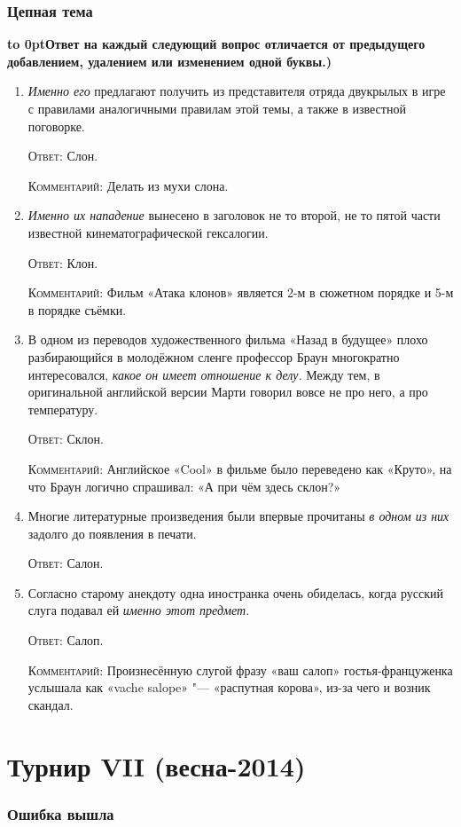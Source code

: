 \documentclass[a4paper,10pt]{article}
\let\keyword\textsc
\newenvironment{topic}{\begin{enumerate}}{\end{enumerate}}
\newcommand{\question}[3]{\item[#1.] #2 \par \keyword{Ответ:} #3}
\newcommand{\commentary}[1]{\par \keyword{Комментарий:} #1}
\newcommand{\topiccommentary}[1]{\begin{adjustwidth}{0.9cm}{} \vspace{-0.3em}\textbf{\hbox to 0pt{\hss{(}}#1)} \end{adjustwidth}}
\begin{document}
\section{Цепная тема}
\topiccommentary{Ответ на каждый следующий вопрос отличается от предыдущего добавлением, удалением или изменением одной буквы.}

\begin{topic}
 \question{10}{\emph{Именно его} предлагают получить из представителя отряда двукрылых в игре с правилами аналогичными правилам этой темы, а также в известной поговорке.}{Слон.}\commentary{Делать из мухи слона.}
 \question{20}{\emph{Именно их нападение} вынесено в заголовок не то второй, не то пятой части известной кинематографической гексалогии.}{Клон.}\commentary{Фильм «Атака клонов» является 2-м в сюжетном порядке и 5-м в порядке съёмки.}
 \question{30}{В одном из переводов художественного фильма «Назад в будущее» плохо разбирающийся в молодёжном сленге профессор Браун многократно интересовался, \emph{какое он имеет отношение к делу.} Между тем, в оригинальной английской версии Марти говорил вовсе не про него, а про температуру.}{Склон.}\commentary{Английское «Cool» в фильме было переведено как «Круто», на что Браун логично спрашивал: «А при чём здесь склон?»}
 \question{40}{Многие литературные произведения были впервые прочитаны \emph{в одном из них} задолго до появления в печати.}{Салон.}
 \question{50}{Согласно старому анекдоту одна иностранка очень обиделась, когда русский слуга подавал ей \emph{именно этот предмет.}}{Салоп.}\commentary{Произнесённую слугой фразу «ваш салоп» гостья-француженка услышала как «vache salope» "--- «распутная корова», из-за чего и возник скандал.}
\end{topic}



\newpage
\part{Турнир VII (весна-2014)}

\section{Ошибка вышла}
\end{document}
